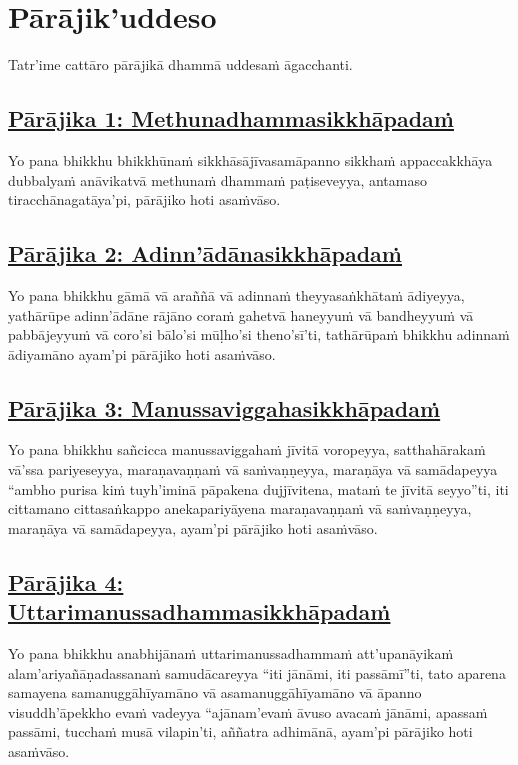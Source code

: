 \section{Pārājik'uddeso}
\label{par}

\begin{intro}
  Tatr'ime cattāro pārājikā dhammā uddesaṁ āgacchanti.
\end{intro}

\setsubsecheadstyle{\subsubsectionFmt}
\subsection*{\hyperref[disq1]{Pārājika 1: Methunadhammasikkhāpadaṁ}}
\label{par1}
Yo pana bhikkhu bhikkhūnaṁ sikkhāsājīvasamāpanno sikkhaṁ appaccakkhāya dubbalyaṁ anāvikatvā methunaṁ dhammaṁ paṭiseveyya, antamaso tiracchānagatāya'pi, pārājiko hoti asaṁvāso.

\subsection*{\hyperref[disq2]{Pārājika 2: Adinn'ādānasikkhāpadaṁ}}
\label{par2}
Yo pana bhikkhu gāmā vā araññā vā adinnaṁ theyyasaṅkhātaṁ ādiyeyya, yathārūpe adinn'ādāne rājāno coraṁ gahetvā haneyyuṁ vā bandheyyuṁ vā pabbājeyyuṁ vā coro'si bālo'si mūḷho'si theno'sī'ti, tathārūpaṁ bhikkhu adinnaṁ ādiyamāno ayam'pi pārājiko hoti asaṁvāso.

\subsection*{\hyperref[disq3]{Pārājika 3: Manussaviggahasikkhāpadaṁ}}
\label{par3}
Yo pana bhikkhu sañcicca manussaviggahaṁ jīvitā voropeyya, satthahārakaṁ vā'ssa pariyeseyya, maraṇavaṇṇaṁ vā saṁvaṇṇeyya, maraṇāya vā samādapeyya “ambho purisa kiṁ tuyh'iminā pāpakena dujjīvitena, mataṁ te jīvitā seyyo”ti, iti cittamano cittasaṅkappo anekapariyāyena maraṇavaṇṇaṁ vā saṁvaṇṇeyya, maraṇāya vā samādapeyya, ayam'pi pārājiko hoti asaṁvāso.

\subsection*{\hyperref[disq4]{Pārājika 4: Uttarimanussadhammasikkhāpadaṁ}}
\label{par4}
Yo pana bhikkhu anabhijānaṁ uttarimanussadhammaṁ att'upanāyikaṁ alam'ariyañāṇadassanaṁ samudācareyya “iti jānāmi, iti passāmī”ti, tato aparena samayena samanuggāhīyamāno vā asamanuggāhīyamāno vā āpanno visuddh'āpekkho evaṁ vadeyya “ajānam'evaṁ āvuso avacaṁ jānāmi, apassaṁ passāmi, tucchaṁ musā vilapin'ti, aññatra adhimānā, ayam'pi pārājiko hoti asaṁvāso.

